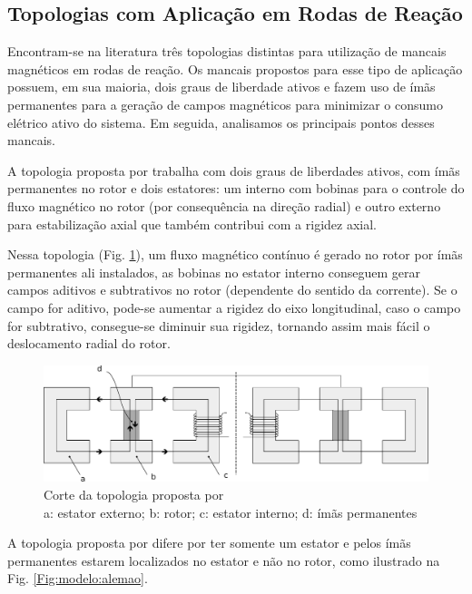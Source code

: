 \subsection{Topologias com Aplicação em Rodas de Reação}

Encontram-se na literatura três topologias distintas para utilização de mancais magnéticos em rodas de reação. Os mancais propostos para esse tipo de aplicação possuem, em sua maioria, dois graus de liberdade ativos e fazem uso de ímãs permanentes para a geração de campos magnéticos para minimizar o consumo elétrico ativo do sistema. Em seguida, analisamos os principais pontos desses mancais.

A topologia proposta por \citet{Bernus1998} trabalha com dois graus de liberdades ativos, com ímãs permanentes no rotor e dois estatores: um interno com bobinas para o controle do fluxo magnético no rotor (por consequência na direção radial) e outro externo para estabilização axial que também contribui com a rigidez axial. 

Nessa topologia (Fig. \ref{Fig:modelo:frances}), um fluxo magnético contínuo é gerado no rotor por ímãs permanentes ali instalados, as bobinas no estator interno conseguem gerar campos aditivos e subtrativos no rotor (dependente do sentido da corrente). Se o campo for aditivo, pode-se aumentar a rigidez do eixo longitudinal, caso o campo for subtrativo, consegue-se diminuir sua rigidez, tornando assim mais fácil o deslocamento radial do rotor.

\begin{figure}[!ht]
	\centering
	\includegraphics[width=1\linewidth]{./Figs/mancais/frances}
	\caption{Corte da topologia proposta por \cite{Bernus1998} \\
	a: estator externo; b: rotor; c: estator interno; d: ímãs permanentes}
	\label{Fig:modelo:frances}
\end{figure}

A topologia proposta por \citet{Scharfe2001} difere por ter somente um estator e pelos ímãs permanentes estarem localizados no estator e não no rotor, como ilustrado na Fig. \ref{Fig:modelo:alemao}. 

